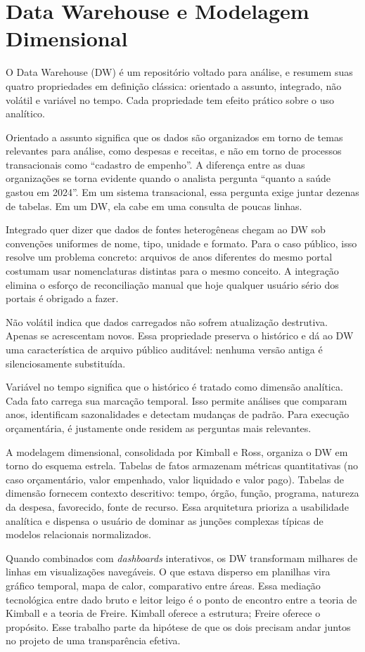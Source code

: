 \section{Data Warehouse e Modelagem Dimensional}

O Data Warehouse (DW) é um repositório voltado para análise, e  resumem suas quatro propriedades em definição clássica: orientado a assunto, integrado, não volátil e variável no tempo. Cada propriedade tem efeito prático sobre o uso analítico.

Orientado a assunto significa que os dados são organizados em torno de temas relevantes para análise, como despesas e receitas, e não em torno de processos transacionais como ``cadastro de empenho''. A diferença entre as duas organizações se torna evidente quando o analista pergunta ``quanto a saúde gastou em 2024''. Em um sistema transacional, essa pergunta exige juntar dezenas de tabelas. Em um DW, ela cabe em uma consulta de poucas linhas.

Integrado quer dizer que dados de fontes heterogêneas chegam ao DW sob convenções uniformes de nome, tipo, unidade e formato. Para o caso público, isso resolve um problema concreto: arquivos de anos diferentes do mesmo portal costumam usar nomenclaturas distintas para o mesmo conceito. A integração elimina o esforço de reconciliação manual que hoje qualquer usuário sério dos portais é obrigado a fazer.

Não volátil indica que dados carregados não sofrem atualização destrutiva. Apenas se acrescentam novos. Essa propriedade preserva o histórico e dá ao DW uma característica de arquivo público auditável: nenhuma versão antiga é silenciosamente substituída.

Variável no tempo significa que o histórico é tratado como dimensão analítica. Cada fato carrega sua marcação temporal. Isso permite análises que comparam anos, identificam sazonalidades e detectam mudanças de padrão. Para execução orçamentária, é justamente onde residem as perguntas mais relevantes.

A modelagem dimensional, consolidada por Kimball e Ross, organiza o DW em torno do esquema estrela. Tabelas de fatos armazenam métricas quantitativas (no caso orçamentário, valor empenhado, valor liquidado e valor pago). Tabelas de dimensão fornecem contexto descritivo: tempo, órgão, função, programa, natureza da despesa, favorecido, fonte de recurso. Essa arquitetura prioriza a usabilidade analítica e dispensa o usuário de dominar as junções complexas típicas de modelos relacionais normalizados.

Quando combinados com \textit{dashboards} interativos, os DW transformam milhares de linhas em visualizações navegáveis. O que estava disperso em planilhas vira gráfico temporal, mapa de calor, comparativo entre áreas. Essa mediação tecnológica entre dado bruto e leitor leigo é o ponto de encontro entre a teoria de Kimball e a teoria de Freire. Kimball oferece a estrutura; Freire oferece o propósito. Esse trabalho parte da hipótese de que os dois precisam andar juntos no projeto de uma transparência efetiva.
